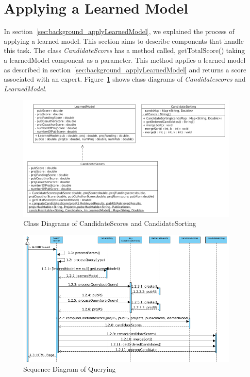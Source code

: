 \section{Applying a Learned Model}\label{section:applyinglearnedmodel}
In section~\ref{sec:background_applyLearnedModel}, we explained the process of applying a learned model. This section aims to describe components
that handle this task. The class \textit{CandidateScores} has a method called, getTotalScore() taking a learnedModel component as a parameter. 
This method applies a learned model as described in section~\ref{sec:background_applyLearnedModel} and returns a score associated with an expert.
Figure~\ref{fig:scoreandsorting} shows class diagrams of \textit{Candidatescores} and \textit{LearnedModel}.

\begin{figure}
\centering
\includegraphics[scale=0.3]{./figures/score&sorting.png}
\caption{Class Diagrams of CandidateScores and CandidateSorting} \label{fig:scoreandsorting} 
\end{figure}

\begin{figure}
\centering
\includegraphics[scale=0.4]{./figures/searchsequence.png}
\caption{Sequence Diagram of Querying} \label{fig:searchsequence} 
\end{figure}

